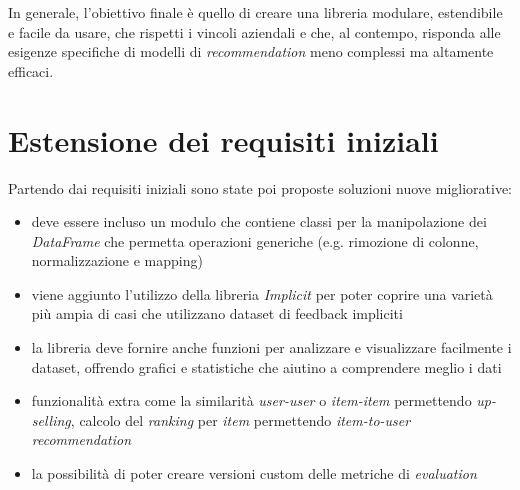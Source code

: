In generale, l'obiettivo finale è quello di creare una libreria modulare, estendibile e facile da usare, che rispetti i vincoli aziendali e che, al contempo, risponda alle esigenze specifiche di modelli di \textit{recommendation} meno complessi ma altamente efficaci.

\section{Estensione dei requisiti iniziali}

Partendo dai requisiti iniziali sono state poi proposte soluzioni nuove migliorative:

\begin{itemize}
    \item deve essere incluso un modulo che contiene classi per la manipolazione dei \textit{DataFrame} che permetta operazioni generiche (e.g. rimozione di colonne, normalizzazione e mapping)
    \item viene aggiunto l'utilizzo della libreria \textit{Implicit} per poter coprire una varietà più ampia di casi che utilizzano dataset di feedback impliciti
    \item la libreria deve fornire anche funzioni per analizzare e visualizzare facilmente i dataset, offrendo grafici e statistiche che aiutino a comprendere meglio i dati 
    \item funzionalità extra come la similarità \textit{user-user} o \textit{item-item} permettendo \textit{up-selling}, calcolo del \textit{ranking} per \textit{item} permettendo \textit{item-to-user recommendation}
    \item la possibilità di poter creare versioni custom delle metriche di \textit{evaluation}
\end{itemize}

